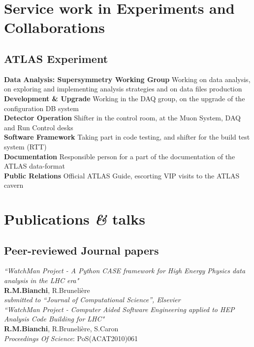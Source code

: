 \documentclass[10pt, a4paper]{article}
\newcommand{\amper}{{\fontspec[Scale=.95]{Linux Libertine Bold}\selectfont\itshape\&}}
\begin{document}

\section*{Service work in Experiments and Collaborations}
\subsection*{ATLAS Experiment}
\noindent
\textbf{Data Analysis: Supersymmetry Working Group} Working on data analysis, on exploring and implementing analysis strategies and on data files production\\
\textbf{Development \& Upgrade} Working in the DAQ group, on the upgrade of the configuration DB system\\
\textbf{Detector Operation} Shifter in the control room, at the Muon System, DAQ and Run Control desks\\
\textbf{Software Framework} Taking part in code testing, and shifter for the build test system (RTT)\\
\textbf{Documentation} Responsible person for a part of the documentation of the ATLAS data-format\\
\textbf{Public Relations} Official ATLAS Guide, escorting VIP visits to the ATLAS cavern\\


\section*{Publications \amper{} talks}
\setcounter{subsection}{0}

\subsection{Peer-reviewed Journal papers}
\noindent

\textit{``WatchMan Project - A Python CASE framework for High Energy Physics data analysis in the LHC era"}\\
\textbf {R.M.Bianchi}, R.Brunelière\\
\emph{\small submitted to ``Journal of Computational Science'', Elsevier}\\


\textit{``WatchMan Project - Computer Aided Software Engineering applied to HEP Analysis Code Building for LHC"}\\
\textbf {R.M.Bianchi}, R.Brunelière, S.Caron\\
\emph{Proceedings Of Science}:   PoS(ACAT2010)061\\
\end{document}
